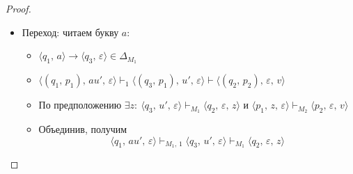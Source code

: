\documentclass[a4paper,12pt]{article}
\theoremstyle{plain}
\theoremstyle{definition}
\theoremstyle{remark}
\begin{document}
\begin{proof}
\begin{itemize}
\begin{itemize}
		      \end{itemize}
		\item Переход: читаем букву $a$:
		      \begin{itemize}
			      \item $\langle q_1,\,a\rangle\to\langle q_3,\,\varepsilon\rangle\in\Delta_{M_1}$
			      \item $\langle(q_1,\,p_1),\,au',\,\varepsilon\rangle\vdash_1\langle(q_3,\,p_1),\,u',\,\varepsilon\rangle\vdash\langle(q_2,\,p_2),\,\varepsilon,\,v\rangle$
			      \item По предположению $\exists z :\: \langle q_3,\,u',\,\varepsilon\rangle\vdash_{M_1}\langle q_2,\,\varepsilon,\,z\rangle$ и $\langle p_1,\,z,\,\varepsilon\rangle\vdash_{M_2}\langle p_2,\,\varepsilon,\,v\rangle$
			      \item Объединив, получим
			            \[
				            \langle q_1,\,au',\,\varepsilon\rangle\vdash_{M_1,\,1}\langle q_3,\,u',\,\varepsilon\rangle\vdash_{M_1}\langle q_2,\,\varepsilon,\,z\rangle
			            \]
		      \end{itemize}


\end{itemize}
\end{proof}
\end{document}
